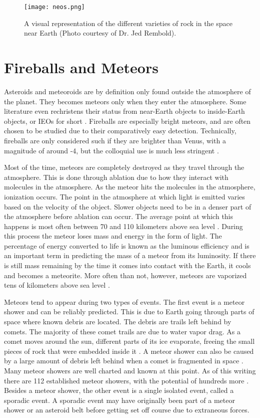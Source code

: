 \begin{figure}[ht!]
  \centering
  \texttt{[image: neos.png]}
  \caption{A visual representation of the different varieties of rock in the space near Earth (Photo courtesy of Dr. Jed Rembold).}
  \label{fig:neos}
\end{figure}


\section{Fireballs and Meteors}

Asteroids and meteoroids are by definition only found outside the atmosphere of the planet. They becomes meteors only when they enter the atmosphere. Some literature even rechristens their status from near-Earth objects to inside-Earth objects, or IEOs for short \cite{Bottke2007}. Fireballs are especially bright meteors, and are often chosen to be studied due to their comparatively easy detection. Technically, fireballs are only considered such if they are brighter than Venus, with a magnitude of around -4, but the colloquial use is much less stringent \cite{Harbaugh2008}. 

Most of the time, meteors are completely destroyed as they travel through the atmosphere. This is done through ablation due to how they interact with molecules in the atmosphere. As the meteor hits the molecules in the atmosphere, ionization occurs. The point in the atmosphere at which light is emitted varies based on the velocity of the object. Slower objects need to be in a denser part of the atmosphere before ablation can occur. The average point at which this happens is most often between 70 and 110 kilometers above sea level \cite{Halliday1996}. During this process the meteor loses mass and energy in the form of light. The percentage of energy converted to life is known as the luminous efficiency and is an important term in predicting the mass of a meteor from its luminosity. If there is still mass remaining by the time it comes into contact with the Earth, it cools and becomes a meteorite. More often than not, however, meteors are vaporized tens of kilometers above sea level \cite{Halliday1996}.

Meteors tend to appear during two types of events. The first event is a meteor shower and can be reliably predicted. This is due to Earth going through parts of space where known debris are located. The debris are trails left behind by comets. The majority of these comet trails are due to water vapor drag. As a comet moves around the sun, different parts of its ice evaporate, freeing the small pieces of rock that were embedded inside it \cite{Whipple1951}. A meteor shower can also be caused by a large amount of debris left behind when a comet is fragmented in space \cite{Jenniskens2006}. Many meteor showers are well charted and known at this point. As of this writing there are 112 established meteor showers, with the potential of hundreds more \cite{RRudawskaZKanuchova2017}. Besides a meteor shower, the other event is a single isolated event, called a sporadic event. A sporadic event may have originally been part of a meteor shower or an asteroid belt before getting set off course due to extraneous forces.

